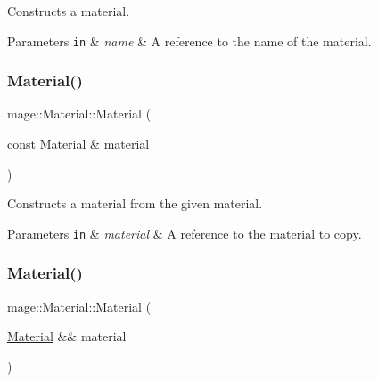 Constructs a material.


\begin{DoxyParams}[1]{Parameters}
\mbox{\tt in}  & {\em name} & A reference to the name of the material. \\
\hline
\end{DoxyParams}
\hypertarget{structmage_1_1_material_abed630412cdc4a6281389d128ec4b5f3}{}\label{structmage_1_1_material_abed630412cdc4a6281389d128ec4b5f3} 
\subsubsection{\texorpdfstring{Material()}{Material()}\hspace{0.1cm}{\footnotesize\ttfamily [2/3]}}
{\footnotesize\ttfamily mage\+::\+Material\+::\+Material (\begin{DoxyParamCaption}\item[{const \hyperlink{structmage_1_1_material}{Material} \&}]{material }\end{DoxyParamCaption})\hspace{0.3cm}{\ttfamily [default]}}

Constructs a material from the given material.


\begin{DoxyParams}[1]{Parameters}
\mbox{\tt in}  & {\em material} & A reference to the material to copy. \\
\hline
\end{DoxyParams}
\hypertarget{structmage_1_1_material_a41bfbc2bfa16e3694ac443d390b804c2}{}\label{structmage_1_1_material_a41bfbc2bfa16e3694ac443d390b804c2} 
\subsubsection{\texorpdfstring{Material()}{Material()}\hspace{0.1cm}{\footnotesize\ttfamily [3/3]}}
{\footnotesize\ttfamily mage\+::\+Material\+::\+Material (\begin{DoxyParamCaption}\item[{\hyperlink{structmage_1_1_material}{Material} \&\&}]{material }\end{DoxyParamCaption})\hspace{0.3cm}{\ttfamily [default]}}

